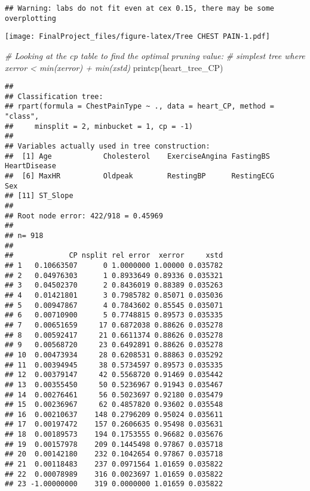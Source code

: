 \documentclass[
]{article}
\newenvironment{Shaded}{\begin{snugshade}}{\end{snugshade}}
\newcommand{\CommentTok}[1]{\textcolor[rgb]{0.56,0.35,0.01}{\textit{#1}}}
\newcommand{\FunctionTok}[1]{\textcolor[rgb]{0.00,0.00,0.00}{#1}}
\newcommand{\NormalTok}[1]{#1}
\begin{document}
\begin{verbatim}
## Warning: labs do not fit even at cex 0.15, there may be some overplotting
\end{verbatim}

\texttt{[image: FinalProject\_files/figure-latex/Tree CHEST PAIN-1.pdf]}

\begin{Shaded}
\begin{Highlighting}[]
\CommentTok{\# Looking at the cp table to find the optimal pruning value:}
\CommentTok{\# simplest tree where xerror \textless{} min(xerror) + min(xstd)}
\FunctionTok{printcp}\NormalTok{(heart\_tree\_CP)}
\end{Highlighting}
\end{Shaded}

\begin{verbatim}
## 
## Classification tree:
## rpart(formula = ChestPainType ~ ., data = heart_CP, method = "class", 
##     minsplit = 2, minbucket = 1, cp = -1)
## 
## Variables actually used in tree construction:
##  [1] Age            Cholesterol    ExerciseAngina FastingBS      HeartDisease  
##  [6] MaxHR          Oldpeak        RestingBP      RestingECG     Sex           
## [11] ST_Slope      
## 
## Root node error: 422/918 = 0.45969
## 
## n= 918 
## 
##             CP nsplit rel error  xerror     xstd
## 1   0.10663507      0 1.0000000 1.00000 0.035782
## 2   0.04976303      1 0.8933649 0.89336 0.035321
## 3   0.04502370      2 0.8436019 0.88389 0.035263
## 4   0.01421801      3 0.7985782 0.85071 0.035036
## 5   0.00947867      4 0.7843602 0.85545 0.035071
## 6   0.00710900      5 0.7748815 0.89573 0.035335
## 7   0.00651659     17 0.6872038 0.88626 0.035278
## 8   0.00592417     21 0.6611374 0.88626 0.035278
## 9   0.00568720     23 0.6492891 0.88626 0.035278
## 10  0.00473934     28 0.6208531 0.88863 0.035292
## 11  0.00394945     38 0.5734597 0.89573 0.035335
## 12  0.00379147     42 0.5568720 0.91469 0.035442
## 13  0.00355450     50 0.5236967 0.91943 0.035467
## 14  0.00276461     56 0.5023697 0.92180 0.035479
## 15  0.00236967     62 0.4857820 0.93602 0.035548
## 16  0.00210637    148 0.2796209 0.95024 0.035611
## 17  0.00197472    157 0.2606635 0.95498 0.035631
## 18  0.00189573    194 0.1753555 0.96682 0.035676
## 19  0.00157978    209 0.1445498 0.97867 0.035718
## 20  0.00142180    232 0.1042654 0.97867 0.035718
## 21  0.00118483    237 0.0971564 1.01659 0.035822
## 22  0.00078989    316 0.0023697 1.01659 0.035822
## 23 -1.00000000    319 0.0000000 1.01659 0.035822
\end{verbatim}
\end{document}
